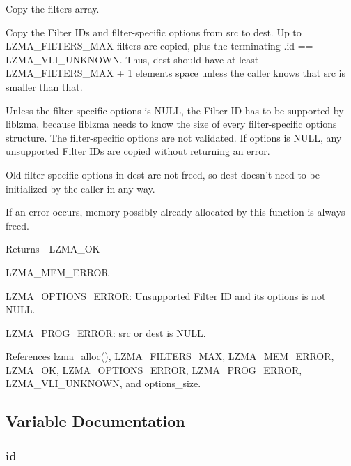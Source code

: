 Copy the filters array. 

Copy the Filter I\-Ds and filter-\/specific options from src to dest. Up to L\-Z\-M\-A\-\_\-\-F\-I\-L\-T\-E\-R\-S\-\_\-\-M\-A\-X filters are copied, plus the terminating .id == L\-Z\-M\-A\-\_\-\-V\-L\-I\-\_\-\-U\-N\-K\-N\-O\-W\-N. Thus, dest should have at least L\-Z\-M\-A\-\_\-\-F\-I\-L\-T\-E\-R\-S\-\_\-\-M\-A\-X + 1 elements space unless the caller knows that src is smaller than that.

Unless the filter-\/specific options is N\-U\-L\-L, the Filter I\-D has to be supported by liblzma, because liblzma needs to know the size of every filter-\/specific options structure. The filter-\/specific options are not validated. If options is N\-U\-L\-L, any unsupported Filter I\-Ds are copied without returning an error.

Old filter-\/specific options in dest are not freed, so dest doesn't need to be initialized by the caller in any way.

If an error occurs, memory possibly already allocated by this function is always freed.

\begin{DoxyReturn}{Returns}
-\/ L\-Z\-M\-A\-\_\-\-O\-K
\begin{DoxyItemize}
\item L\-Z\-M\-A\-\_\-\-M\-E\-M\-\_\-\-E\-R\-R\-O\-R
\item L\-Z\-M\-A\-\_\-\-O\-P\-T\-I\-O\-N\-S\-\_\-\-E\-R\-R\-O\-R\-: Unsupported Filter I\-D and its options is not N\-U\-L\-L.
\item L\-Z\-M\-A\-\_\-\-P\-R\-O\-G\-\_\-\-E\-R\-R\-O\-R\-: src or dest is N\-U\-L\-L. 
\end{DoxyItemize}
\end{DoxyReturn}


References lzma\-\_\-alloc(), L\-Z\-M\-A\-\_\-\-F\-I\-L\-T\-E\-R\-S\-\_\-\-M\-A\-X, L\-Z\-M\-A\-\_\-\-M\-E\-M\-\_\-\-E\-R\-R\-O\-R, L\-Z\-M\-A\-\_\-\-O\-K, L\-Z\-M\-A\-\_\-\-O\-P\-T\-I\-O\-N\-S\-\_\-\-E\-R\-R\-O\-R, L\-Z\-M\-A\-\_\-\-P\-R\-O\-G\-\_\-\-E\-R\-R\-O\-R, L\-Z\-M\-A\-\_\-\-V\-L\-I\-\_\-\-U\-N\-K\-N\-O\-W\-N, and options\-\_\-size.



\subsection{Variable Documentation}
\subsubsection[{id}]{ id}\label{filter__common_8c_a3ee597b96b2ff619e515fac79a1ba1c5}


